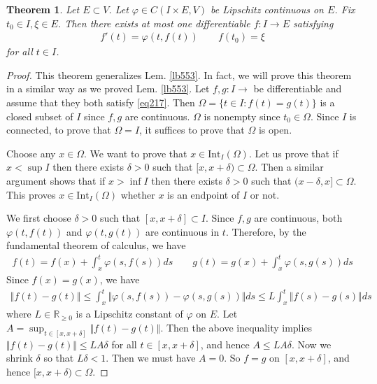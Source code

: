 \documentclass[12pt,b5paper,notitlepage]{article}
\theoremstyle{definition}
\theoremstyle{plain}
\newtheorem{thm}[df]{Theorem}
\newcommand{\Rbb}{\mathbb R}
\newcommand{\dps}{\displaystyle}
\newcommand{\Int}{\mathrm{Int}}
\numberwithin{equation}{section}
\begin{document}
\begin{thm}\label{lb554}
Let $E\subset V$. Let $\varphi\in C(I\times E,V)$ be Lipschitz continuous on $E$. Fix $t_0\in I,\xi\in E$. Then there exists at most one differentiable $f:I\rightarrow E$ satisfying
\begin{gather}\label{eq217}
f'(t)=\varphi(t,f(t))\qquad f(t_0)=\xi
\end{gather} 
for all $t\in I$.
\end{thm}



\begin{proof}
This theorem generalizes Lem. \ref{lb553}. In fact, we will prove this theorem in a similar way as we proved Lem. \ref{lb553}. Let $f,g:I\rightarrow$ be differentiable and assume that they both satisfy \eqref{eq217}. Then $\Omega=\{t\in I:f(t)=g(t)\}$ is a closed subset of $I$ since $f,g$ are continuous. $\Omega$ is nonempty since $t_0\in\Omega$. Since $I$ is connected, to prove that $\Omega=I$, it suffices to prove that $\Omega$ is open.

Choose any $x\in\Omega$. We want to prove that $x\in\Int_I(\Omega)$. Let us prove that if $x<\sup I$ then there exists $\delta>0$ such that $[x,x+\delta)\subset \Omega$. Then a similar argument shows that if $x>\inf I$ then there exists $\delta>0$ such that $(x-\delta,x]\subset\Omega$. This proves $x\in\Int_I(\Omega)$ whether $x$ is an endpoint of $I$ or not.

We first choose $\delta>0$ such that $[x,x+\delta]\subset I$. Since $f,g$ are continuous, both $\varphi(t,f(t))$ and $\varphi(t,g(t))$ are continuous in $t$. Therefore, by the fundamental theorem of calculus, we have
\begin{gather*}
f(t)=f(x)+\int^t_x\varphi(s,f(s))ds\qquad g(t)=g(x)+\int_x^t\varphi(s,g(s))ds
\end{gather*}
Since $f(x)=g(x)$, we have
\begin{align*}
\Vert f(t)-g(t)\Vert\leq\int_x^t \Vert \varphi(s,f(s))-\varphi(s,g(s))\Vert ds\leq L\int_x^t\Vert f(s)-g(s)\Vert ds
\end{align*}
where $L\in\Rbb_{\geq0}$ is a Lipschitz constant of $\varphi$ on $E$. Let $\dps A=\sup_{t\in[x,x+\delta]}\Vert f(t)-g(t)\Vert$. Then the above inequality implies $\Vert f(t)-g(t)\Vert\leq LA\delta$ for all $t\in[x,x+\delta]$, and hence $A\leq LA\delta$. Now we shrink $\delta$ so that $L\delta<1$. Then we must have $A=0$. So $f=g$ on $[x,x+\delta]$, and hence $[x,x+\delta)\subset\Omega$.
\end{proof}
\end{document}
